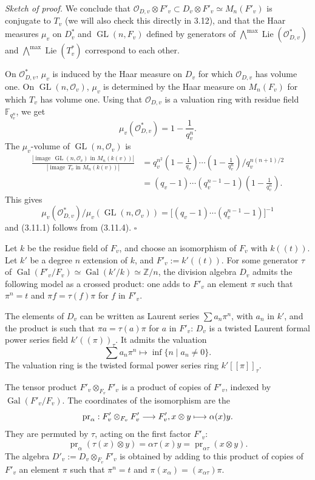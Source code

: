\documentclass[10pt]{article}
\newcommand{\Z}{\mathbb Z}
\newcommand{\GL}{\operatorname{GL}}
\newcommand{\Gal}{\operatorname{Gal}}
\newcommand{\Lie}{\operatorname{Lie}}
\newcommand{\OO}{\mathcal O}
\theoremstyle{deligne}
\newenvironment{sketchproof}[1][Sketch of proof.]{\textit{#1}}{\hfill$\square$}
\newcommand{\heading}[1]{\vspace{0.7em}\noindent{\bfseries #1}\quad}
\begin{document}
\begin{sketchproof}
We conclude that $\mathcal O_{D,v}\otimes F'_v\subset D_v\otimes F'_v\simeq M_n(F'_v)$ is conjugate to $T_v$ (we will also check this directly in 3.12), and that the Haar measures $\mu_v$ on $D_v^*$ and $\GL(n,F_v)$ defined by generators of $\bigwedge^{\max}\Lie(\mathcal O_{D,v}^*)$ and $\bigwedge^{\max}\Lie(T_v^*)$ correspond to each other.

On $\mathcal O_{D,v}^*$, $\mu_v$ is induced by the Haar measure on $D_v$ for which $\mathcal O_{D,v}$ has volume one. On $\GL(n,\OO_v)$, $\mu_v$ is determined by the Haar measure on $M_n(F_v)$ for which $T_v$ has volume one. Using that $\mathcal O_{D,v}$ is a valuation ring with residue field $\mathbb F_{q_v^n}$, we get
\[
\mu_v(\mathcal O_{D,v}^*)=1-\frac{1}{q_v^n}.
\]
The $\mu_v$-volume of $\GL(n,\OO_v)$ is
\begin{align*}
\frac{|\operatorname{image}\,\GL(n,\OO_v)\text{ in }M_n(k(v))|}{|\operatorname{image}\,T_v\text{ in }M_n(k(v))|}
&=q_v^{n^2}\left(1-\frac1{q_v}\right)\cdots\left(1-\frac1{q_v^n}\right)/q_v^{n(n+1)/2}\\
&=(q_v-1)\cdots(q_v^{n-1}-1)\left(1-\frac1{q_v^n}\right).
\end{align*}
This gives
\[
\mu_v(\mathcal O_{D,v}^*)/\mu_v(\GL(n,\OO_v))=\bigl[(q_v-1)\cdots(q_v^{n-1}-1)\bigr]^{-1}
\]
and (3.11.1) follows from (3.11.4).
\end{sketchproof}

\heading{3.12.} Let $k$ be the residue field of $F_v$, and choose an isomorphism of $F_v$ with $k((t))$. Let $k'$ be a degree $n$ extension of $k$, and $F'_v:=k'((t))$. For some generator $\tau$ of $\Gal(F'_v/F_v)\simeq\Gal(k'/k)\simeq\Z/n$, the division algebra $D_v$ admits the following model as a crossed product: one adds to $F'_v$ an element $\pi$ such that $\pi^n=t$ and $\pi f=\tau(f)\pi$ for $f$ in $F'_v$.

The elements of $D_v$ can be written as Laurent series $\sum a_n\pi^n$, with $a_n$ in $k'$, and the product is such that $\pi a=\tau(a)\pi$ for $a$ in $F'_v$: $D_v$ is a twisted Laurent formal power series field $k'((\pi))_\tau$. It admits the valuation
\[
\sum a_n\pi^n\longmapsto \inf\{n\mid a_n\ne0\}.
\]
The valuation ring is the twisted formal power series ring $k'[[\pi]]_\tau$.

The tensor product $F'_v\otimes_{F_v}F'_v$ is a product of copies of $F'_v$, indexed by $\Gal(F'_v/F_v)$. The coordinates of the isomorphism are the
\[
\operatorname{pr}_\alpha:F'_v\otimes_{F_v}F'_v\longrightarrow F'_v,\\ x\otimes y\longmapsto\alpha(x)y.
\]
They are permuted by $\tau$, acting on the first factor $F'_v$:
\[
\operatorname{pr}_\alpha(\tau(x)\otimes y)=\alpha\tau(x)y=\operatorname{pr}_{\alpha\tau}(x\otimes y).
\]
The algebra $D'_v:=D_v\otimes_{F_v}F'_v$ is obtained by adding to this product of copies of $F'_v$ an element $\pi$ such that $\pi^n=t$ and $\pi(x_\alpha)=(x_{\alpha\tau})\pi$.
\end{document}
